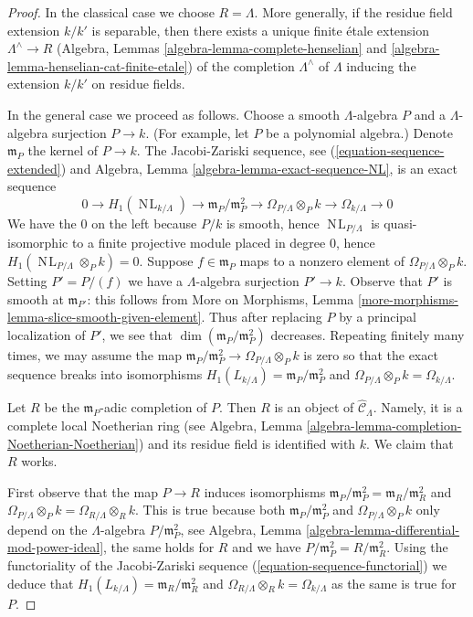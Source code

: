 \documentclass{stacks-project}
\theoremstyle{plain}
\theoremstyle{definition}
\theoremstyle{remark}
\numberwithin{equation}{subsection}
\def\NL{\mathop{N\!L}\nolimits}
\begin{document}
\begin{proof}
In the classical case we choose $R = \Lambda$. More generally, if
the residue field extension $k/k'$ is separable, then there exists
a unique finite \'etale extension $\Lambda^\wedge \to R$
(Algebra, Lemmas \ref{algebra-lemma-complete-henselian} and
\ref{algebra-lemma-henselian-cat-finite-etale})
of the completion $\Lambda^\wedge$ of $\Lambda$
inducing the extension $k/k'$ on residue fields.

\medskip\noindent
In the general case we proceed as follows. Choose a smooth
$\Lambda$-algebra $P$ and a $\Lambda$-algebra surjection $P \to k$.
(For example, let $P$ be a polynomial algebra.)
Denote $\mathfrak m_P$ the kernel of $P \to k$. The Jacobi-Zariski sequence,
see (\ref{equation-sequence-extended}) and 
Algebra, Lemma \ref{algebra-lemma-exact-sequence-NL}, is an
exact sequence
$$
0 \to H_1(\NL_{k/\Lambda}) \to
\mathfrak m_P/\mathfrak m_P^2 \to
\Omega_{P/\Lambda} \otimes_P k \to
\Omega_{k/\Lambda} \to 0
$$
We have the $0$ on the left because $P/k$ is smooth, hence
$\NL_{P/\Lambda}$ is quasi-isomorphic to a finite projective module
placed in degree $0$, hence $H_1(\NL_{P/\Lambda} \otimes_P k) = 0$.
Suppose $f \in \mathfrak m_P$ maps to a nonzero element
of $\Omega_{P/\Lambda} \otimes_P k$. Setting $P' = P/(f)$ we have a
$\Lambda$-algebra surjection $P' \to k$.
Observe that $P'$ is smooth at $\mathfrak m_{P'}$:
this follows from More on Morphisms, Lemma
\ref{more-morphisms-lemma-slice-smooth-given-element}.
Thus after replacing $P$ by a principal localization
of $P'$, we see that $\dim(\mathfrak m_P/\mathfrak m_P^2)$
decreases. Repeating finitely many times, we may assume
the map $\mathfrak m_P/\mathfrak m_P^2 \to
\Omega_{P/\Lambda} \otimes_P k$ is zero so that
the exact sequence breaks into isomorphisms
$H_1(L_{k/\Lambda}) = \mathfrak m_P/\mathfrak m_P^2$ and
$\Omega_{P/\Lambda} \otimes_P k = \Omega_{k/\Lambda}$.

\medskip\noindent
Let $R$ be the $\mathfrak m_P$-adic completion of $P$.
Then $R$ is an object of $\widehat{\mathcal{C}}_\Lambda$.
Namely, it is a complete local Noetherian ring (see
Algebra, Lemma \ref{algebra-lemma-completion-Noetherian-Noetherian})
and its residue field is identified with $k$.
We claim that $R$ works.

\medskip\noindent
First observe that the map $P \to R$ induces isomorphisms
$\mathfrak m_P/\mathfrak m_P^2 = \mathfrak m_R/\mathfrak m_R^2$
and $\Omega_{P/\Lambda} \otimes_P k = \Omega_{R/\Lambda} \otimes_R k$.
This is true because both $\mathfrak m_P/\mathfrak m_P^2$
and $\Omega_{P/\Lambda} \otimes_P k$ only depend on the
$\Lambda$-algebra $P/\mathfrak m_P^2$, see
Algebra, Lemma \ref{algebra-lemma-differential-mod-power-ideal},
the same holds for $R$ and we have $P/\mathfrak m_P^2 = R/\mathfrak m_R^2$.
Using the functoriality of the Jacobi-Zariski sequence
(\ref{equation-sequence-functorial})
we deduce that $H_1(L_{k/\Lambda}) = \mathfrak m_R/\mathfrak m_R^2$ and
$\Omega_{R/\Lambda} \otimes_R k = \Omega_{k/\Lambda}$
as the same is true for $P$.


\end{proof}
\end{document}
